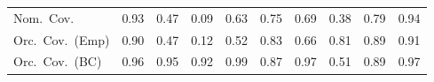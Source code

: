 \begin{table}[!htbp]
{\begin{tabular}{lrrrrrrrrr}
\quad Nom.\ Cov. & \cellcolor{ranktwo}0.93 & 0.47 & 0.09 & 0.63 & 0.75 & 0.69 & 0.38 & \cellcolor{rankthree}0.79 & \cellcolor{rankone}0.94 \\
\quad Orc.\ Cov.\ (Emp) & \cellcolor{ranktwo}0.90 & 0.47 & 0.12 & 0.52 & 0.83 & 0.66 & 0.81 & \cellcolor{rankthree}0.89 & \cellcolor{rankone}0.91 \\
\quad Orc.\ Cov.\ (BC) & \cellcolor{ranktwo}0.96 & \cellcolor{rankone}0.95 & 0.92 & 0.99 & 0.87 & \cellcolor{rankthree}0.97 & 0.51 & 0.89 & \cellcolor{rankthree}0.97 \\
\bottomrule
\end{tabular}}
\end{table}
